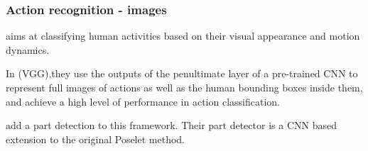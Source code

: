 \begin{frame}
\frametitle{Action recognition - images}


 aims at classifying human activities based on their visual appearance and motion dynamics.

\bigskip

In \cite{simonyan2014very} (VGG),they use the outputs of the penultimate layer of a pre-trained CNN to represent full images of actions as well as the human bounding boxes inside them, and achieve a high level of performance in action classification.

\bigskip

 \cite{gkioxari2015actions} add a part detection to this framework. Their part detector is a CNN based extension to the original Poselet \cite{pishchulin2013poselet} method.

\end{frame}

